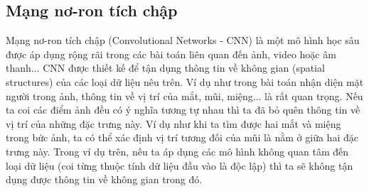 \subsection{Mạng nơ-ron tích chập}
	Mạng nơ-ron tích chập (Convolutional Networks - CNN) là một mô hình học sâu được áp dụng rộng rãi trong các bài toán liên quan đến ảnh, video hoặc âm thanh...
	CNN được thiết kế để tận dụng thông tin về không gian (spatial structures) của các loại dữ liệu nêu trên.
	Ví dụ như trong bài toán nhận diện mặt người trong ảnh, thông tin về vị trí của mắt, mũi, miệng... là rất quan trọng.
	Nếu ta coi các điểm ảnh đều có ý nghĩa tương tự nhau thì ta đã bỏ quên thông tin về vị trí của những đặc trưng này.
	Ví dụ như khi ta tìm được hai mắt và miệng trong bức ảnh, ta có thể xác định vị trí tương đối của mũi là nằm ở giữa hai đặc trưng này.
	Trong ví dụ trên, nếu ta áp dụng các mô hình không quan tâm đến loại dữ liệu (coi từng thuộc tính dữ liệu đầu vào là độc lập) thì ta sẽ không tận dụng được thông tin về không gian trong đó.
	
